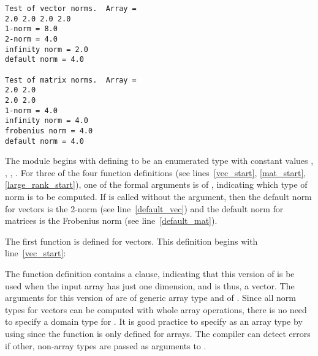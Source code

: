 \small{
\begin{verbatim}
Test of vector norms.  Array = 
2.0 2.0 2.0 2.0
1-norm = 8.0
2-norm = 4.0
infinity norm = 2.0
default norm = 4.0

Test of matrix norms.  Array = 
2.0 2.0
2.0 2.0
1-norm = 4.0
infinity norm = 4.0
frobenius norm = 4.0
default norm = 4.0
\end{verbatim}}

The  module begins with defining  to be an
enumerated type with constant values , , 
, .
For three of the four  function definitions (see lines~\ref{vec_start},
\ref{mat_start}, \ref{large_rank_start}), 
one of the formal arguments is of , indicating which type of norm 
is to be computed.  If  is called without the  argument,
then the default norm for vectors is the 2-norm (see line~\ref{default_vec}) and 
the default norm for matrices is the Frobenius norm (see line~\ref{default_mat}).  

The first  function is defined for vectors.  This definition
begins with line~\ref{vec_start}:
\begin{chapel}
  def norm(x: [], p: normType) where x.rank == 1 {
\end{chapel}
The function definition contains a  clause, indicating that
this version of  is be used when the input array 
has just one dimension, and is thus, a vector.  The arguments for this version
of  are  of generic array type and  of .  
Since all norm types for vectors can be computed with whole array operations, there 
is no need to specify a domain type for .  It is good practice to
specify  as an array type by using \chpl{: []} since the 
function is only defined for arrays.  The compiler can detect errors if other,
non-array types are passed as arguments to .


